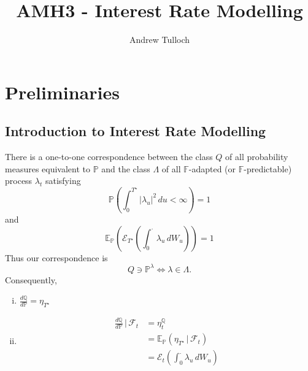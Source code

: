 \documentclass[10pt, oneside, reqno]{amsbook}
\title{AMH3 - Interest Rate Modelling}								%
\author{Andrew Tulloch}
\theoremstyle{plain}%
\theoremstyle{definition}
\theoremstyle{remark}
\newcommand{\given}{ \, | \,}
\newcommand{\sigf}{\mathcal{F}}
\newcommand{\Q}{\mathbb{Q}}
\newcommand{\E}{\mathbb{E}}
\renewcommand{\P}{\mathbb{P}}
\newcommand{\F}{\mathbb{F}}
\newcommand{\doleans}[1]{\mathcal E_t \left(\int_0^\cdot #1 \right)}
\numberwithin{equation}{chapter}
\begin{document}


\maketitle \tableofcontents \clearpage


\tableofcontents

\chapter{Preliminaries} %
\label{cha:preliminaries}

\section{Introduction to Interest Rate Modelling} %
\label{sec:introduction_to_interest_rate_modelling}

There is a one-to-one correspondence between the class $Q$ of all probability measures equivalent to $\P$ and the class $\Lambda$ of all $\F$-adapted (or $\F$-predictable) process $\lambda_t$ satisfying \[
	\P\left(\int_0^{T^\star} |\lambda_u|^2 \, du < \infty \right) = 1
\]
and \[
	\E_\P\left( \mathcal{E}_{T^\star} \left(\int_0^\cdot \lambda_u \, dW_u\right) \right) = 1
\] 
Thus our correspondence is \[Q \ni \P^\lambda \iff \lambda \in \Lambda.\]
Consequently, \begin{enumerate}[(i)]
	\item $\frac{d\Q}{d\P} = \eta_{T^\star}$
	\item \begin{align*}
		\frac{d\Q}{d\P} \given \sigf_t 	&= \eta^\Q_t \\
										&= \E_\P\left(\eta_{T^\star} \given \sigf_t \right) \\
										&= \doleans{\lambda_u \, dW_u}
	\end{align*}
\end{enumerate}
\end{document}
